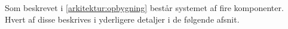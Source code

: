 Som beskrevet i \cref{arkitektur:opbygning} består systemet af fire komponenter.
Hvert af disse beskrives i yderligere detaljer i de følgende afsnit.